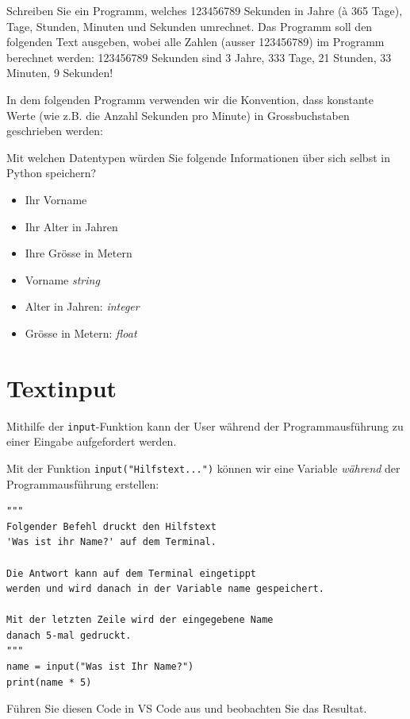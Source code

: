 \begin{mychallenge}\label{ex:sToY}
	Schreiben Sie ein Programm, welches 123456789 Sekunden in Jahre (à 365 Tage), Tage, Stunden, Minuten und Sekunden umrechnet.
	Das Programm soll den folgenden Text ausgeben, wobei alle Zahlen (ausser 123456789) im Programm berechnet werden: 123456789 Sekunden sind 3 Jahre, 333 Tage, 21 Stunden, 33 Minuten, 9 Sekunden!
	\begin{myanswer}
		In dem folgenden Programm verwenden wir die Konvention, dass konstante Werte (wie z.B. die Anzahl Sekunden pro Minute) in Grossbuchstaben geschrieben werden:
		
	\end{myanswer}
\end{mychallenge}

\begin{myexercise}\label{ex:datatypes}
	Mit welchen Datentypen würden Sie folgende Informationen über sich selbst in Python speichern?
	\begin{itemize}
		\item Ihr Vorname
		\item Ihr Alter in Jahren
		\item Ihre Grösse in Metern
	\end{itemize}
	\begin{myanswer}
		\begin{itemize}
			\item Vorname \emph{string}
			\item Alter in Jahren: \emph{integer}
			\item Grösse in Metern: \emph{float}
		\end{itemize}
	\end{myanswer}
\end{myexercise}

\section{Textinput}
Mithilfe der \lstinline{input}-Funktion kann der User während der Programmausführung zu einer Eingabe aufgefordert werden.
\begin{myexample}\label{ex:input}
Mit der Funktion \lstinline|input("Hilfstext...")| können wir eine Variable \emph{während} der Programmausführung erstellen:

\begin{lstlisting}
""" 
Folgender Befehl druckt den Hilfstext 
'Was ist ihr Name?' auf dem Terminal. 

Die Antwort kann auf dem Terminal eingetippt 
werden und wird danach in der Variable name gespeichert. 

Mit der letzten Zeile wird der eingegebene Name 
danach 5-mal gedruckt.
"""
name = input("Was ist Ihr Name?") 
print(name * 5)
\end{lstlisting}

Führen Sie diesen Code in VS Code aus und beobachten Sie das Resultat.
\end{myexample}

